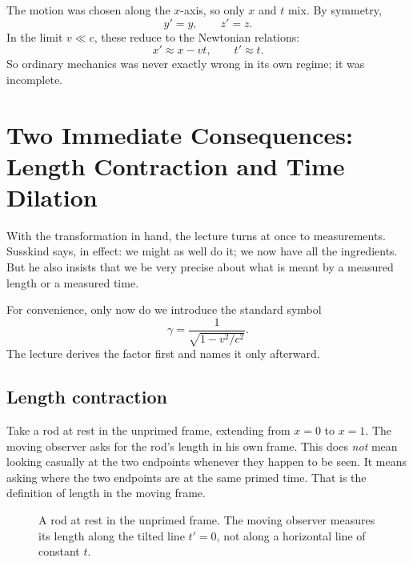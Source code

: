 The motion was chosen along the \(x\)-axis, so only \(x\) and \(t\) mix. By symmetry,
\begin{equation}
y'=y,\qquad z'=z.
\end{equation}
In the limit \(v\ll c\), these reduce to the Newtonian relations:
\begin{equation}
x'\approx x-vt,\qquad t'\approx t.
\end{equation}
So ordinary mechanics was never exactly wrong in its own regime; it was incomplete.

\section{Two Immediate Consequences: Length Contraction and Time Dilation}

With the transformation in hand, the lecture turns at once to measurements. Susskind says, in effect: we might as well do it; we now have all the ingredients. But he also insists that we be very precise about what is meant by a measured length or a measured time.

For convenience, only now do we introduce the standard symbol
\begin{equation}
\gamma=\frac{1}{\sqrt{1-v^2/c^2}}.
\end{equation}
The lecture derives the factor first and names it only afterward.

\subsection{Length contraction}

Take a rod at rest in the unprimed frame, extending from \(x=0\) to \(x=1\). The moving observer asks for the rod's length in his own frame. This does \emph{not} mean looking casually at the two endpoints whenever they happen to be seen. It means asking where the two endpoints are at the same primed time. That is the definition of length in the moving frame.

\begin{figure}
\centering
{}
\caption{A rod at rest in the unprimed frame. The moving observer measures its length along the tilted line \(t'=0\), not along a horizontal line of constant \(t\).}
\end{figure}

